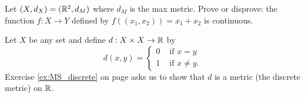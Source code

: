 \item Let $(X,d_X) = (\mathbb{R}^2, d_M)$ where $d_M$ is the max metric.  Prove or disprove: the function $f:X \to Y$ defined by $f((x_1,x_2)) = x_1 + x_2$ is continuous. 

\ea


\begin{comment}

\ExerciseSolution 
\ba
\item Let $a = (a_1, a_2)$ be in $X$.  We will demonstrate that $f$ is continuous at $a$.  Let $\epsilon$ be greater than $0$. Let $\delta = \frac{\epsilon}{2}$. Suppose $x = (x_1,x_2) \in X$ such that $d_E(x,a) < \delta$. Then
\[d_E(x,a) = \sqrt{(x_1-a_1)^2 + (x_2-a_2)^2} < \delta.\]
Now
\[|x_1-a_1| = \sqrt{(x_1-a_1)^2} \leq \sqrt{(x_1-a_1)^2 + (x_2-a_2)^2} < \delta = \frac{\epsilon}{2}\]
and
\[|x_2-a_2| = \sqrt{(x_2-a_2)^2} \leq \sqrt{(x_1-a_1)^2 + (x_2-a_2)^2} < \delta = \frac{\epsilon}{2}.\]
This implies that 
\begin{align*}
d_E(f(x),f(a)) &= |(x_1+x_2)-(a_1+a_2)| \\
	&= |(x_1-a_1)+(x_2-a_2)| \\
	&\leq |x_1-a_1| + |x_2-a_2| \\
	&< \frac{\epsilon}{2} + \frac{\epsilon}{2} \\
	&= \epsilon.
\end{align*}
Thus, $f$ is continuous at every point in $X$ and so $f$ is a continuous function.

\item Let $a = (a_1, a_2)$ be in $X$.  We will demonstrate that $f$ is continuous at $a$.  Let $\epsilon$ be greater than $0$. Let $\delta = \frac{\epsilon}{2}$. Suppose $x = (x_1,x_2) \in X$ such that $d_M(x,a) < \delta$. Then
\[d_M(x,a) = \max\{|x_1-a_1|, |x_2-a_2|\}  < \delta = \epsilon.\]
\begin{align*}
d_E(f(x),f(a)) &= |(x_1+x_2)-(a_1+a_2)| \\
	&= |(x_1-a_1)+(x_2-a_2)| \\
	&\leq |x_1-a_1| + |x_2-a_2| \\
	&< \frac{\epsilon}{2} + \frac{\epsilon}{2} \\
	&= \epsilon.
\end{align*}
Thus, $f$ is continuous at every point in $X$ and so $f$ is a continuous function.


\ea

\end{comment} 


\item Let $X$ be any set and define $d : X \times X \to \mathbb{R}$ by 
\[d(x,y) = \begin{cases} 0 &\text{ if } x=y \\ 1 &\text{ if } x \neq y. \end{cases}\]
Exercise \ref{ex:MS_discrete} on page \pageref{ex:MS_discrete} asks us to show that $d$ is a metric (the discrete metric) on $\mathbb{R}$. 

